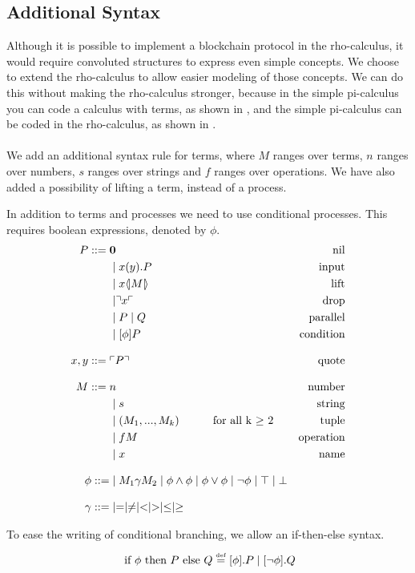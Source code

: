 

\subsection{Additional Syntax} \label{sec:addsyntax}
Although it is possible to implement a blockchain protocol in the rho-calculus, it would require convoluted structures to express even simple concepts.
We choose to extend the rho-calculus to allow easier modeling of those concepts.
We can do this without making the rho-calculus stronger, because in the simple pi-calculus you can code a calculus with terms, as shown in \citep{Baldamus2005}, and the simple pi-calculus can be coded in the rho-calculus, as shown in \citep{Meredith2005}.\\
\\
We add an additional syntax rule for terms, where $M$ ranges over terms, $n$ ranges over numbers, $s$ ranges over strings and $f$ ranges over operations. We have also added a possibility of lifting a term, instead of a process.

In addition to terms and processes we need to use conditional processes. This requires boolean expressions, denoted by \ensuremath{\phi}.
\begin{align*}
P  ::= \; &  \mathbf{0} & \text{nil} \\
      & \mid x(y).P & \text{input} \\
	  & \mid x \langle \! | M | \! \rangle&\text{lift}\\
      & \mid \urcorner x \ulcorner & \text{drop} \\
      & \mid P \mid Q & \text{parallel} \\
      & \mid [\phi] P & \text{condition} \\[3mm]
    x,y ::= \; & \ulcorner P \urcorner & \text{quote}\\[3mm]
M::=\; & n &\text{number}\\
 	  &\mid s &\text{string}\\
 	  &\mid (M_1,...,M_k)\quad\quad\quad \text{for all k $\geq$ 2} &\text{tuple}\\
 	  &\mid fM &\text{operation}\\
 	  &\mid x &\text{name}\\[3mm]
\phi ::=& \mid M_1\gamma M_2 \mid \phi\land\phi \mid \phi\lor\phi \mid \neg\phi \mid \top \mid \bot\\[3mm]
\gamma ::=& \mid = \mid \neq \mid < \mid > \mid \leq \mid \geq
\end{align*}

To ease the writing of conditional branching, we allow an if-then-else syntax.
\begin{align*}
	\text{ if }\phi\text{ then }P\text{ else }Q \overset{\underset{\mathrm{def}}{}}{=} [\phi].P \mid [\neg \phi].Q
\end{align*}



